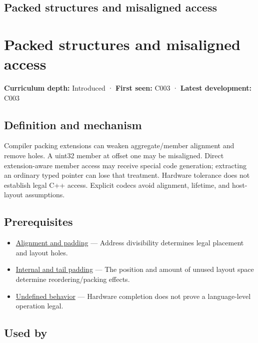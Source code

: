 \hypertarget{appendix-0682dbfc5f0e}{}
\section*{Packed structures and misaligned access}
\chapter{Packed structures and misaligned access}\label{appendix-0682dbfc5f0e-packed-structures-and-misaligned-access}

\textbf{Curriculum depth:} Introduced · \textbf{First seen:} C003 · \textbf{Latest development:} C003

\section{Definition and mechanism}\label{appendix-0682dbfc5f0e-definition-and-mechanism}

Compiler packing extensions can weaken aggregate/member alignment and remove holes. A uint32 member at offset one may be misaligned. Direct extension-aware member access may receive special code generation; extracting an ordinary typed pointer can lose that treatment. Hardware tolerance does not establish legal C++ access. Explicit codecs avoid alignment, lifetime, and host-layout assumptions.

\section{Prerequisites}\label{appendix-0682dbfc5f0e-prerequisites}

\begin{itemize}
\tightlist
\item
  \hyperref[appendix-a1f7c53b4742]{Alignment and padding} --- Address divisibility determines legal placement and layout holes.
\item
  \hyperref[appendix-f52f8c5a3afd]{Internal and tail padding} --- The position and amount of unused layout space determine reordering/packing effects.
\item
  \hyperref[appendix-f558f5b4d8f2]{Undefined behavior} --- Hardware completion does not prove a language-level operation legal.
\end{itemize}

\section{Used by}\label{appendix-0682dbfc5f0e-used-by}

